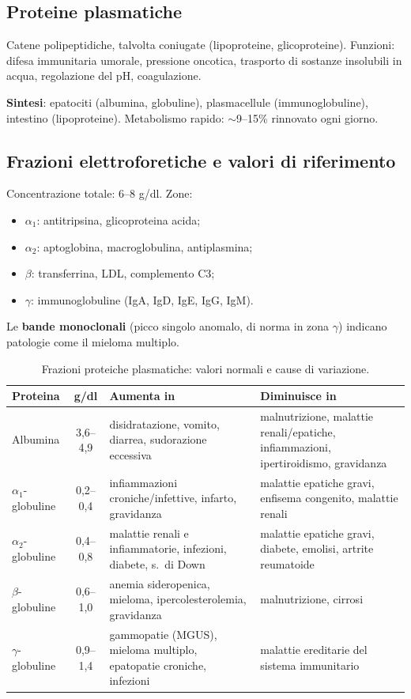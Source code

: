 \subsection{Proteine plasmatiche}
Catene polipeptidiche, talvolta coniugate (lipoproteine, glicoproteine). Funzioni: difesa
immunitaria umorale, pressione oncotica, trasporto di sostanze insolubili in acqua, regolazione
del pH, coagulazione.

\textbf{Sintesi}: epatociti (albumina, globuline), plasmacellule (immunoglobuline), intestino
(lipoproteine). Metabolismo rapido: $\sim$9--15\% rinnovato ogni giorno.

\subsection{Frazioni elettroforetiche e valori di riferimento}
Concentrazione totale: 6--8 g/dl. Zone:
\begin{itemize}
  \item \textbf{$\alpha_1$}: antitripsina, glicoproteina acida;
  \item \textbf{$\alpha_2$}: aptoglobina, macroglobulina, antiplasmina;
  \item \textbf{$\beta$}: transferrina, LDL, complemento C3;
  \item \textbf{$\gamma$}: immunoglobuline (IgA, IgD, IgE, IgG, IgM).
\end{itemize}
Le \textbf{bande monoclonali} (picco singolo anomalo, di norma in zona $\gamma$) indicano patologie
come il mieloma multiplo.

\begin{table}[htbp]
  \centering \small \renewcommand{\arraystretch}{1.3}
  \begin{tabularx}{\textwidth}{|l|c|X|X|}
    \hline
    \textbf{Proteina} & \textbf{g/dl} & \textbf{Aumenta in} & \textbf{Diminuisce in} \\
    \hline
    Albumina & 3,6--4,9
      & disidratazione, vomito, diarrea, sudorazione eccessiva
      & malnutrizione, malattie renali/epatiche, infiammazioni, ipertiroidismo, gravidanza \\
    \hline
    $\alpha_1$-globuline & 0,2--0,4
      & infiammazioni croniche/infettive, infarto, gravidanza
      & malattie epatiche gravi, enfisema congenito, malattie renali \\
    \hline
    $\alpha_2$-globuline & 0,4--0,8
      & malattie renali e infiammatorie, infezioni, diabete, s.\ di Down
      & malattie epatiche gravi, diabete, emolisi, artrite reumatoide \\
    \hline
    $\beta$-globuline & 0,6--1,0
      & anemia sideropenica, mieloma, ipercolesterolemia, gravidanza
      & malnutrizione, cirrosi \\
    \hline
    $\gamma$-globuline & 0,9--1,4
      & gammopatie (MGUS), mieloma multiplo, epatopatie croniche, infezioni
      & malattie ereditarie del sistema immunitario \\
    \hline
  \end{tabularx}
  \caption{Frazioni proteiche plasmatiche: valori normali e cause di variazione.}
  \label{tab:proteine-plasmatiche}
\end{table}


